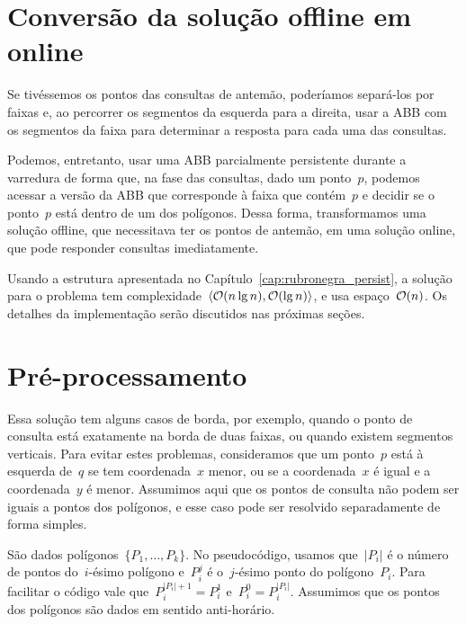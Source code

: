 \documentclass[main.tex]{subfiles}
\begin{document}
\section{Conversão da solução offline em online}

Se tivéssemos os pontos das consultas de antemão, poderíamos separá-los por faixas e, ao percorrer os segmentos da esquerda para a direita, usar a ABB com os segmentos da faixa para determinar a resposta para cada uma das consultas.

Podemos, entretanto, usar uma ABB parcialmente persistente durante a varredura de forma que, na fase das consultas, dado um ponto~$p$, podemos acessar a versão da ABB que corresponde à faixa que contém~$p$ e decidir se o ponto~$p$ está dentro de um dos polígonos. Dessa forma, transformamos uma solução offline, que necessitava ter os pontos de antemão, em uma solução online, que pode responder consultas imediatamente.

Usando a estrutura apresentada no Capítulo~\ref{cap:rubronegra_persist}, a solução para o problema tem complexidade~$\langle\mathcal{O}(n \lg n), \mathcal{O}(\lg n)\rangle$, e usa espaço~$\mathcal{O}(n)$. Os detalhes da implementação serão discutidos nas próximas seções.


\section{Pré-processamento}

Essa solução tem alguns casos de borda, por exemplo, quando o ponto de consulta está exatamente na borda de duas faixas, ou quando existem segmentos verticais. Para evitar estes problemas, consideramos que um ponto~$p$ está à esquerda de~$q$ se tem coordenada~$x$ menor, ou se a coordenada~$x$ é igual e a coordenada~$y$ é menor. Assumimos aqui que os pontos de consulta não podem ser iguais a pontos dos polígonos, e esse caso pode ser resolvido separadamente de forma simples.

\providecommand{\from}{\V{from}}
\providecommand{\tto}{\V{to}}
\providecommand{\topp}{\V{top}}
\providecommand{\seg}{\V{seg}}
\providecommand{\add}{\V{add}}
\providecommand{\events}{\V{points}}
\providecommand{\rbt}{\V{rbt}}
\providecommand{\slabs}{\V{slabs}}
\providecommand{\current}{\V{current}}
\providecommand{\polygon}{\V{polygon}}

São dados polígonos~$\{P_1, \ldots, P_k\}$. No pseudocódigo, usamos que~$|P_i|$ é o número de pontos do~\mbox{$i$-ésimo} polígono e~$P_i^j$ é o~$j$-ésimo ponto do polígono~$P_i$. Para facilitar o código vale que~${P_i^{|P_i|+1} = P_i^1}$ e~${P_i^0 = P_i^{|P_i|}}$. Assumimos que os pontos dos polígonos são dados em sentido anti-horário.
\end{document}
